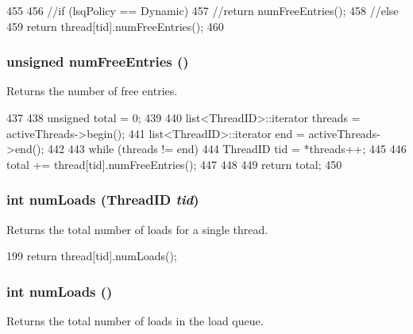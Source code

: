 \begin{DoxyCode}
455 {
456     //if (lsqPolicy == Dynamic)
457     //return numFreeEntries();
458     //else
459         return thread[tid].numFreeEntries();
460 }
\end{DoxyCode}
\hypertarget{classLSQ_a028971a565aca048c67ea1c36a6a9d51}{
\subsubsection[{numFreeEntries}]{\setlength{\rightskip}{0pt plus 5cm}unsigned numFreeEntries ()}}
\label{classLSQ_a028971a565aca048c67ea1c36a6a9d51}
Returns the number of free entries. 


\begin{DoxyCode}
437 {
438     unsigned total = 0;
439 
440     list<ThreadID>::iterator threads = activeThreads->begin();
441     list<ThreadID>::iterator end = activeThreads->end();
442 
443     while (threads != end) {
444         ThreadID tid = *threads++;
445 
446         total += thread[tid].numFreeEntries();
447     }
448 
449     return total;
450 }
\end{DoxyCode}
\hypertarget{classLSQ_adcdafd05eb96f01fa490a847d57d0bec}{
\subsubsection[{numLoads}]{\setlength{\rightskip}{0pt plus 5cm}int numLoads ({\bf ThreadID} {\em tid})}}
\label{classLSQ_adcdafd05eb96f01fa490a847d57d0bec}
Returns the total number of loads for a single thread. 


\begin{DoxyCode}
199     { return thread[tid].numLoads(); }
\end{DoxyCode}
\hypertarget{classLSQ_a54460b759fb06e2b18e26657279a6f49}{
\subsubsection[{numLoads}]{\setlength{\rightskip}{0pt plus 5cm}int numLoads ()}}
\label{classLSQ_a54460b759fb06e2b18e26657279a6f49}
Returns the total number of loads in the load queue. 



